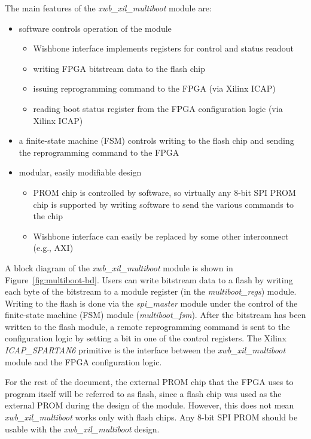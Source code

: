 \documentclass[a4paper,11pt]{article}
\begin{document}
The main features of the \textit{xwb\_xil\_multiboot} module are:
\begin{itemize}
  \item software controls operation of the module
  \begin{itemize}
    \item Wishbone interface implements registers for control and status readout
    \item writing FPGA bitstream data to the flash chip
    \item issuing reprogramming command to the FPGA (via Xilinx ICAP)
    \item reading boot status register from the FPGA configuration logic (via Xilinx ICAP)
  \end{itemize}
  \item a finite-state machine (FSM) controls writing to the flash chip and sending the
  reprogramming command to the FPGA
  \item modular, easily modifiable design
  \begin{itemize}
    \item PROM chip is controlled by software, so virtually any 8-bit SPI PROM chip is
    supported by writing software to send the various commands to the chip
    \item Wishbone interface can easily be replaced by some other interconnect (e.g., AXI)
  \end{itemize}
\end{itemize}

A block diagram of the \textit{xwb\_xil\_multiboot} module is shown in Figure~\ref{fig:multiboot-bd}.
Users can write bitstream data to a flash by writing each byte of the bitstream to a module register
(in the \textit{multiboot\_regs}) module. Writing to the flash is done via the \textit{spi\_master}
module under the control of the finite-state machine (FSM) module (\textit{multiboot\_fsm}). After the
bitstream has been written to the flash module, a remote reprogramming command is sent
to the configuration logic by setting a bit in one of the control registers. The
Xilinx \textit{ICAP\_SPARTAN6} primitive is the interface between the \textit{xwb\_xil\_multiboot}
module and the FPGA configuration logic.

For the rest of the document, the external PROM chip that the FPGA uses to
program itself will be referred to as flash, since a flash chip was used
as the external PROM during the design of the module. However, this does not
mean \textit{xwb\_xil\_multiboot} works only with flash chips. Any 8-bit SPI PROM
should be usable with the \textit{xwb\_xil\_multiboot} design.
\end{document}
